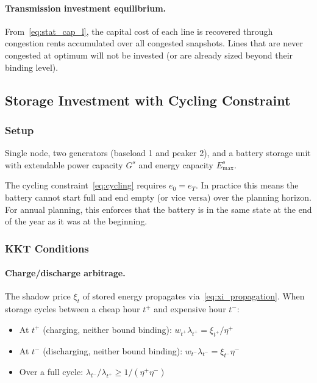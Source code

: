 \documentclass{article}
\begin{document}
\paragraph{Transmission investment equilibrium.}
From~\eqref{eq:stat_cap_l}, the capital cost of each line is recovered through
congestion rents accumulated over all congested snapshots. Lines that are never
congested at optimum will not be invested (or are already sized beyond their
binding level).

\subsection{Storage Investment with Cycling Constraint}
\label{sec:storage_example}

\subsubsection{Setup}

Single node, two generators (baseload 1 and peaker 2), and a battery storage
unit with extendable power capacity $G^s$ and energy capacity $E^s_{\max}$.

The cycling constraint~\eqref{eq:cycling} requires $e_0 = e_T$.
In practice this means the battery cannot start full and end empty (or vice versa)
over the planning horizon. For annual planning, this enforces that the battery
is in the same state at the end of the year as it was at the beginning.

\subsubsection{KKT Conditions}

\paragraph{Charge/discharge arbitrage.}
The shadow price $\xi_t$ of stored energy propagates via~\eqref{eq:xi_propagation}.
When storage cycles between a cheap hour $t^+$ and expensive hour $t^-$:
\begin{itemize}
    \item At $t^+$ (charging, neither bound binding): $w_{t^+} \lambda_{t^+} = \xi_{t^+} / \eta^+$
    \item At $t^-$ (discharging, neither bound binding): $w_{t^-} \lambda_{t^-} = \xi_{t^-} \eta^-$
    \item Over a full cycle: $\lambda_{t^-} / \lambda_{t^+} \ge 1/(\eta^+ \eta^-)$
\end{itemize}
\end{document}
